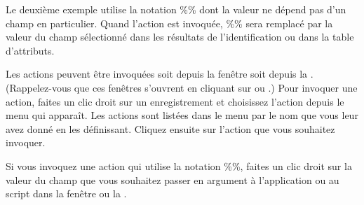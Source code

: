 Le deuxième exemple utilise la notation \%\% dont la valeur ne dépend pas d'un champ en particulier. Quand l'action est invoquée, \%\% sera remplacé par la valeur du champ sélectionné dans les résultats de l'identification ou dans la table d'attributs.

\label{label_usingactions}
Les actions peuvent être invoquées soit depuis la fenêtre  soit depuis la . (Rappelez-vous que ces fenêtres s'ouvrent en cliquant sur  ou .)
Pour invoquer une action, faites un clic droit sur un enregistrement et choisissez l'action depuis le menu qui apparaît. Les actions sont listées dans le menu par le nom que vous leur avez donné en les définissant. Cliquez ensuite sur l'action que vous souhaitez invoquer.

Si vous invoquez une action qui utilise la notation \%\%, faites un clic droit sur la valeur du champ que vous souhaitez passer en argument à l'application ou au script dans la fenêtre  ou la .

